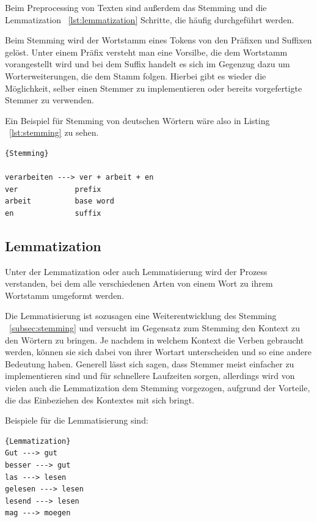 Beim Preprocessing von Texten sind außerdem das Stemming und die Lemmatization ~\ref{lst:lemmatization} Schritte, die häufig durchgeführt werden.

Beim Stemming wird der Wortstamm eines Tokens von den Präfixen und Suffixen gelöst.
Unter einem Präfix versteht man eine Vorsilbe, die dem Wortstamm vorangestellt wird und bei dem Suffix handelt es sich im Gegenzug dazu um Worterweiterungen, die dem Stamm folgen.
Hierbei gibt es wieder die Möglichkeit, selber einen Stemmer zu implementieren oder bereits vorgefertigte Stemmer zu verwenden.\cite{textAnalysisMonkeylearn, machineLearningTextAnalysis}

Ein Beispiel für Stemming von deutschen Wörtern wäre also in Listing ~\ref{lst:stemming} zu sehen.

\begin{lstlisting}[label={lst:stemming},caption={Stemming von deutschen Wörtern}]{Stemming}

verarbeiten ---> ver + arbeit + en
ver             prefix
arbeit          base word
en              suffix
\end{lstlisting}

\subsection{Lemmatization}\label{subsec:lemmatization}

Unter der Lemmatization oder auch Lemmatisierung wird der Prozess verstanden, bei dem alle verschiedenen Arten von einem Wort zu ihrem Wortstamm umgeformt werden.

Die Lemmatisierung ist sozusagen eine Weiterentwicklung des Stemming ~\ref{subsec:stemming} und versucht im Gegensatz zum Stemming den Kontext zu den Wörtern zu bringen.
Je nachdem in welchem Kontext die Verben gebraucht werden, können sie sich dabei von ihrer Wortart unterscheiden und so eine andere Bedeutung haben.
Generell lässt sich sagen, dass Stemmer meist einfacher zu implementieren sind und für schnellere Laufzeiten sorgen, allerdings wird von vielen auch die Lemmatization dem Stemming vorgezogen, aufgrund der Vorteile, die das Einbeziehen des Kontextes mit sich bringt.\cite{machineLearningTextAnalysis, textAnalysisMonkeylearn, stemmingLemmatization}


Beispiele für die Lemmatisierung sind:

\begin{lstlisting}[label={lst:lemmatization},caption={Lemmatisierung von deutschen Wörtern}]{Lemmatization}
Gut ---> gut
besser ---> gut
las ---> lesen
gelesen ---> lesen
lesend ---> lesen
mag ---> moegen

\end{lstlisting}

